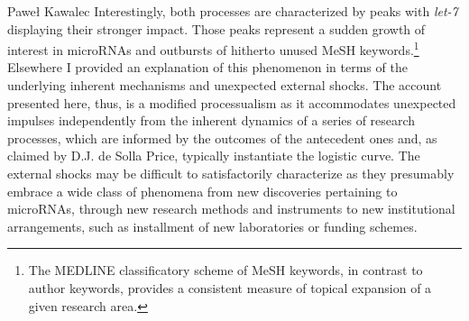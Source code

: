 \begin{artengenv}{Paweł Kawalec}
Interestingly, both processes are characterized by peaks with \textit{let-7} displaying their stronger impact. Those peaks represent a sudden growth of interest in microRNAs and outbursts of hitherto unused MeSH keywords.\footnote{The MEDLINE classificatory scheme of MeSH keywords, in contrast to author keywords, provides a consistent measure of topical expansion of a given research area.} Elsewhere
\parencite[][]{giovagnoli_cognitive_2020} %
 I provided an explanation of this phenomenon in terms of the underlying inherent mechanisms and unexpected external shocks. The account presented here, thus, is a modified processualism as it accommodates unexpected impulses independently from the inherent dynamics of a series of research processes, which are informed by the outcomes of the antecedent ones and, as claimed by D.J. de Solla Price, typically instantiate the logistic curve. The external shocks may be difficult to satisfactorily characterize as they presumably embrace a wide class of phenomena from new discoveries pertaining to microRNAs, through new research methods and instruments to new institutional arrangements, such as installment of new laboratories or funding schemes.


\end{artengenv}
